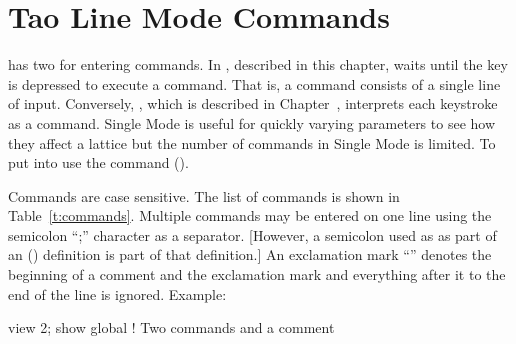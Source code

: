 \chapter{Tao Line Mode Commands}
\label{c:command}

\tao has two  for entering commands. In ,
described in this chapter, \tao waits until the  key is
depressed to execute a command. That is, a command consists of a
single line of input. Conversely, , which is described
in Chapter~, interprets each keystroke as a
command. Single Mode is useful for quickly varying parameters to see
how they affect a lattice but the number of commands in Single Mode is
limited. To put \tao into  use the 
command ().

Commands are case sensitive. The list of commands is shown in
Table~\ref{t:commands}. Multiple commands may be entered on one line
using the semicolon ``;'' character as a separator.  [However, a
semicolon used as as part of an  () definition
is part of that definition.]
An exclamation mark ``\vn{!}'' denotes the beginning of
a comment and the exclamation mark and everything after it to the end
of the line is ignored.  Example:
\begin{example}
  view 2; show global  ! Two commands and a comment
\end{example}


